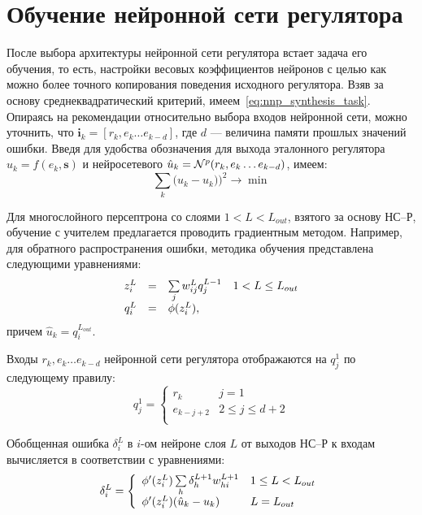 \section{Обучение нейронной сети регулятора}

После выбора архитектуры нейронной сети регулятора встает задача его
обучения, то есть, настройки весовых коэффициентов нейронов с целью
как можно более точного копирования поведения исходного регулятора.
Взяв за основу среднеквадратический критерий,
имеем~\eqref{eq:nnp_synthesis_task}.  Опираясь на рекомендации
относительно выбора входов нейронной сети, можно уточнить, что
$\mathbf{i}_k=[r_k,e_k\ldots e_{k-d}]$, где $d$ --- величина памяти
прошлых значений ошибки.  Введя для удобства обозначения для выхода
эталонного регулятора $u_k=f(e_k,\mathbf{s})$ и нейросетевого
$\hat{u}_k=\mathcal{N}^p(r_k,e_k\ldots e_{k-d})$, имеем:
\begin{equation}
  \sum\limits_k\big(u_k-\hat{u}_k)\big)^2\rightarrow\min
\end{equation}

Для многослойного персептрона со слоями $1<L<L_{out}$, взятого за
основу НС--Р, обучение с учителем предлагается проводить градиентным
методом.  Например, для обратного распространения ошибки, методика
обучения представлена следующими уравнениями:
\begin{equation}
  \begin{array}{rcll}
    z^L_i & = & \sum\limits_j w^L_{ij}q^{L-1}_j & 1<L\le L_{out}\\
    q^L_i & = & \phi(z^L_i), & \\
  \end{array}
\end{equation}причем $\hat{u}_k=q^{L_{out}}_i$.

Входы $r_k,e_k\ldots e_{k-d}$ нейронной сети регулятора отображаются
на $q^1_j$ по следующему правилу:
\begin{equation}
  q^1_j =\left\{
  \begin{array}{ll}
    r_k & j=1 \\
    e_{k-j+2} & 2\le j\le d+2 \\
  \end{array}\right.
\end{equation}

Обобщенная ошибка $\delta^L_i$ в $i$-ом нейроне слоя $L$ от выходов
НС--Р к входам вычисляется в соответствии с уравнениями:
\begin{equation}
  \delta^L_i=\left\{
  \begin{array}{ll}
    \phi'(z^L_i)\sum\limits_h\delta^{L+1}_h w^{L+1}_{hi} & 1\le L<L_{out} \\
    \phi'(z^L_i)(\hat{u}_k-u_k) & L=L_{out} \\
  \end{array}\right.
\end{equation}

